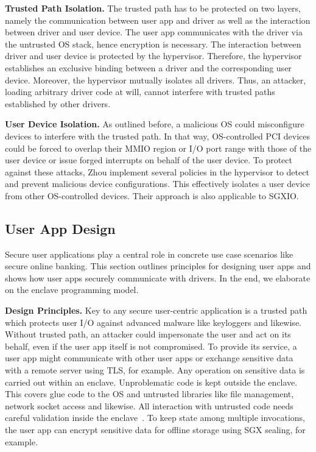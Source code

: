 \documentclass{sig-alternate-05-2015}
\begin{document}
\textbf{Trusted Path Isolation.}
The trusted path has to be protected on two layers, namely the communication between user app and driver as well as the interaction between driver and user device. 
The user app communicates with the driver via the untrusted OS stack, hence encryption is necessary. 
The interaction between driver and user device is protected by the hypervisor. 
Therefore, the hypervisor establishes an exclusive binding between a driver and the corresponding user device. 
Moreover, the hypervisor mutually isolates all drivers. 
Thus, an attacker, loading arbitrary driver code at will, cannot interfere with trusted paths established by other drivers.

\textbf{User Device Isolation.}
As outlined before, a malicious OS could misconfigure devices to interfere with the trusted path. 
In that way, OS-controlled PCI devices could be forced to overlap their MMIO region or I/O port range with those of the user device or issue forged interrupts on behalf of the user device. 
To protect against these attacks, Zhou \etal implement several policies in the hypervisor to detect and prevent malicious device configurations. 
This effectively isolates a user device from other OS-controlled devices. 
Their approach is also applicable to SGXIO.

\subsection{User App Design}
Secure user applications play a central role in concrete use case scenarios like secure online banking. 
This section outlines principles for designing user apps and shows how user apps securely communicate with drivers. 
In the end, we elaborate on the enclave programming model. 

\textbf{Design Principles.}
Key to any secure user-centric application is a trusted path which protects user I/O against advanced malware like keyloggers and likewise. 
Without trusted path, an attacker could impersonate the user and act on its behalf, even if the user app itself is not compromised. 
To provide its service, a user app might communicate with other user apps or exchange sensitive data with a remote server using TLS, for example. 
Any operation on sensitive data is carried out within an enclave. 
Unproblematic code is kept outside the enclave. 
This covers glue code to the OS and untrusted libraries like file management, network socket access and likewise. 
All interaction with untrusted code needs careful validation inside the enclave~\cite{ports_towards_2008,checkoway_iago_2013,haven}. 
To keep state among multiple invocations, the user app can encrypt sensitive data for offline storage using SGX sealing, for example. 
\end{document}
